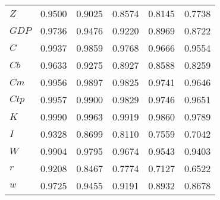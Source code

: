 \begin{center}
\begin{longtable}{lccccc}
$Z       $	 & 	    0.9500	 & 	    0.9025	 & 	    0.8574	 & 	    0.8145	 & 	    0.7738 \\ 
$GDP     $	 & 	    0.9736	 & 	    0.9476	 & 	    0.9220	 & 	    0.8969	 & 	    0.8722 \\ 
$C       $	 & 	    0.9937	 & 	    0.9859	 & 	    0.9768	 & 	    0.9666	 & 	    0.9554 \\ 
$Cb      $	 & 	    0.9633	 & 	    0.9275	 & 	    0.8927	 & 	    0.8588	 & 	    0.8259 \\ 
$Cm      $	 & 	    0.9956	 & 	    0.9897	 & 	    0.9825	 & 	    0.9741	 & 	    0.9646 \\ 
$Ctp     $	 & 	    0.9957	 & 	    0.9900	 & 	    0.9829	 & 	    0.9746	 & 	    0.9651 \\ 
$K       $	 & 	    0.9990	 & 	    0.9963	 & 	    0.9919	 & 	    0.9860	 & 	    0.9789 \\ 
$I       $	 & 	    0.9328	 & 	    0.8699	 & 	    0.8110	 & 	    0.7559	 & 	    0.7042 \\ 
$W       $	 & 	    0.9904	 & 	    0.9795	 & 	    0.9674	 & 	    0.9543	 & 	    0.9403 \\ 
$r       $	 & 	    0.9208	 & 	    0.8467	 & 	    0.7774	 & 	    0.7127	 & 	    0.6522 \\ 
$w       $	 & 	    0.9725	 & 	    0.9455	 & 	    0.9191	 & 	    0.8932	 & 	    0.8678 \\ 
\end{longtable}
 \end{center}

